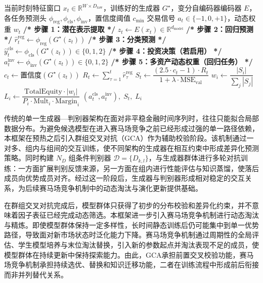 \begin{algorithm}[H]
\caption{下游任务推理与信号生成}
\label{alg:highdim_inference}
\begin{algorithmic}[0]
\Require 当前时刻特征窗口 $x_t \in \mathbb{R}^{W \times D_{\text{raw}}}$，训练好的生成器 $G^{\star}$，变分自编码器编码器 $E$，各任务预测头 $\phi_{\text{reg}}, \phi_{\text{cls}}, \phi_{\text{inv}}$，置信度阈值 $c_{\min}$
\Ensure 交易信号 $a_t \in \{-1, 0, +1\}$，动态权重 $w_t$
\Statex
\State \textbf{/* 步骤 1：潜在表示提取 */}
\State $z_t \leftarrow E(x_t) \in \mathbb{R}^{d_{\text{model}}}$
\Statex
\State \textbf{/* 步骤 2：回归预测 */}
\State $\hat{r}_t^{\text{reg}} \leftarrow \phi_{\text{reg}}(G^{\star}(z_t))$
\Statex
\State \textbf{/* 步骤 3：分类预测 */}
\State $\hat{y}_t^{\text{cls}} \leftarrow \phi_{\text{cls}}(G^{\star}(z_t)) \in \{0, 1, 2\}$ 
\Statex
\State \textbf{/* 步骤 4：投资决策（若启用） */}
\State $a_t^{\text{inv}} \leftarrow \phi_{\text{inv}}(G^{\star}(z_t)) \in \{0, 1, 2\}$
\Statex
\State \textbf{/* 步骤 5：多资产动态权重（回归任务） */}
\State $c_t \leftarrow \text{置信度}(G^{\star}(z_t))$ 
\State $R_t \leftarrow \sum_{\tau=1}^{t} \hat{r}_{\tau}^{\text{reg}}$ 
\State $S_t \leftarrow \dfrac{(2.5 \cdot c_t - 1) \cdot R_t}{1 + \lambda \cdot \text{MSE}_{\text{val}}}$
\State $w_i \leftarrow \dfrac{|S_i|}{\sum_j |S_j|}$ 
\State $L_i \leftarrow \dfrac{\text{TotalEquity} \cdot |w_i|}{P_i \cdot \text{Mult}_i \cdot \text{Margin}_i}$ 
\Statex
\State \Return $(a_t^{\text{cls}}, a_t^{\text{inv}}), \; S_t, \; L_i$
\end{algorithmic}
\end{algorithm}

传统的单一生成器—判别器架构在面对非平稳金融时间序列时，往往只能拟合局部数据分布。为避免候选模型在进入赛马场竞争之前已经形成过强的单一路径依赖，本框架在预热之后引入群组交叉对抗（GCA）作为辅助校验阶段。该机制通过一对多、组内与组间的交互训练，使不同架构的生成器在相互约束中形成差异化预测策略。同时构建 $N_D$ 组条件判别器 $\mathcal{D} = \{D_{k,l}\}$，与生成器群体进行多轮对抗训练：一方面扩展判别反馈来源，另一方面在组内进行性能评估与知识蒸馏，使落后成员向优势成员对齐。经过这一阶段后，生成器与判别器形成相对稳定的交互关系，为后续赛马场竞争机制中的动态淘汰与演化更新提供基础。

在群组交叉对抗完成后，模型群体只获得了初步的分布校验和差异化约束，并不意味着因子表征已经完成动态筛选。本框架进一步引入赛马场竞争机制进行动态淘汰与精炼。即使模型群体保持一定多样性，长时间静态训练后仍可能集中到单一优势路径，导致面对新市场状态时泛化能力下降。赛马场竞争机制通过周期性的全局评估、学生模型培养与末位淘汰替换，引入新的参数起点并淘汰表现不足的成员，使模型群体在持续更新中保持探索能力。由此，GCA承担前置交叉校验功能，赛马场竞争机制承担持续选优、替换和知识迁移功能，二者在训练流程中形成前后衔接而非并列替代关系。

